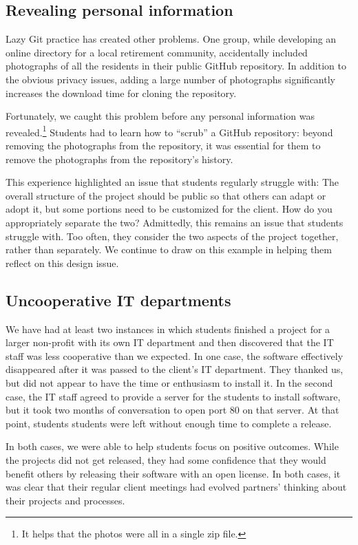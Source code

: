 \subsection{Revealing personal information}

Lazy Git practice has created other problems.  One group, while
developing an online directory for a local retirement community,
accidentally included photographs of all the residents in their
public GitHub repository.  In addition to the obvious privacy issues,
adding a large number of photographs significantly increases
the download time for cloning the repository.

Fortunately, we caught this problem before any personal information
was revealed.\footnote{It helps that the photos were all in a single
zip file.}  Students had to learn how to ``scrub'' a GitHub repository:
beyond removing the photographs from the repository, it was essential
for them to remove the photographs from the repository's history.

This experience highlighted an issue that students regularly struggle
with: The overall structure of the project should be public so that
others can adapt or adopt it, but some portions need to be customized
for the client.  How do you appropriately separate the two?
Admittedly, this remains an issue that students struggle with. Too
often, they consider the two aspects of the project together, rather
than separately.  We continue to draw on this example in helping them
reflect on this design issue.

\subsection{Uncooperative IT departments}

We have
had at least two instances in which students finished a project for
a larger non-profit with its own IT department and then discovered
that the IT staff was less cooperative than we expected.  In one
case, the software effectively disappeared after it was passed to
the client's IT department.  They thanked us, but did not appear
to have the time or enthusiasm to install it.  In the second case,
the IT staff agreed to provide a server for the students to install
software, but it took two months of conversation to open port 80 on
that server.  At that point, students students were left without enough
time to complete a release.

In both cases, we were able to help students focus on positive
outcomes.  While the projects did not get released, they had some
confidence that they would benefit others by releasing their software
with an open license. In both cases, it was clear that their
regular client meetings had evolved partners' thinking about their
projects and processes.

